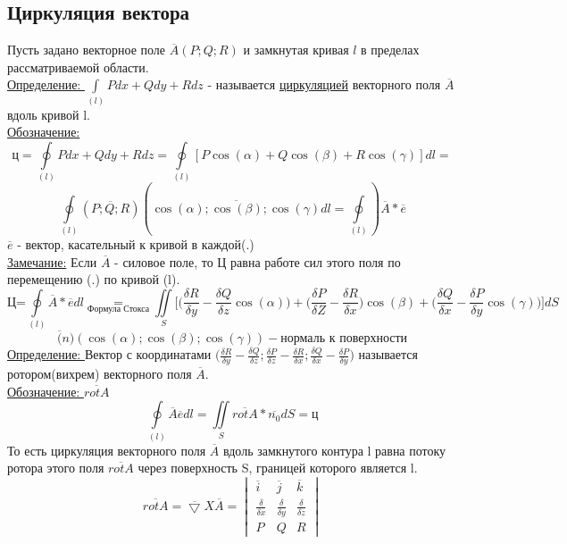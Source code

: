 \documentclass[12pt]{article}
\let\oldint\int
\let\oldiint\iint
\let\oldoint\oint
\renewcommand{\int}{\oldint\limits}
\renewcommand{\oint}{\oldoint\limits}
\renewcommand{\iint}{\oldiint\limits}
\begin{document}
  \subsection{Циркуляция вектора}
  Пусть задано векторное поле $\overline{A}(P;Q;R)$ и замкнутая кривая $l$ в пределах рассматриваемой
  области.\\
  \underline{Определение: }$\int_{(l)} Pdx+Qdy+Rdz$ - называется \underline{циркуляцией} векторного поля
  $\overline{A}$ вдоль кривой l.\\
  \underline{Обозначение:} 
  \[\text{ц} = \oint_{(l)} Pdx+Qdy+Rdz= \oint_{(l)}[P\cos(\alpha)+Q\cos(\beta)+R\cos(\gamma)]dl=\]
  \[\oint_{(l)}(\overline{P;Q;R})(\overline{\cos(\alpha);\cos(\beta);\cos(\gamma)}dl=
  \oint_{(l)})\overline{A}*\overline{e}\]
  $\overline{e}$ - вектор, касательный к кривой в каждой(.)\\
  \underline{Замечание:} Если $\overline{A}$ - силовое поле, то Ц равна работе сил этого поля по
  перемещению (.) по кривой (l).
  \[\text{Ц=} \oint_{(l)} \overline{A}*\overline{e}dl \underset{\text{Формула Стокса}}{=}
  \iint_S \Big[\Big(\frac{\delta R}{\delta y}-\frac{\delta Q}{\delta z}\cos(\alpha)\Big)
  + \Big(\frac{\delta P}{\delta Z} - \frac{\delta R}{\delta x}\Big)\cos(\beta)
  + \Big(\frac{\delta Q}{\delta x}-\frac{\delta P}{\delta y}\cos(\gamma)\Big)\Big]dS\]
  \[\overline(n)(\cos(\alpha);\cos(\beta);\cos(\gamma)) - \text{нормаль к поверхности}\]
  \underline{Определение: } Вектор с координатами $\Big(\frac{\delta R}{\delta y}-\frac{\delta Q}{\delta z};
  \frac{\delta P}{\delta z}-\frac{\delta R}{\delta x};\frac{\delta Q}{\delta x} - \frac{\delta P}{\delta y}\Big)$
  называется ротором(вихрем) векторного поля $\overline{A}$.\\
  \underline{Обозначение: } $\overline{rotA}$
  \[\oint_{(l)}\overline{A}\overline{e}dl = \iint_S \overline{rotA}*\overline{n_0}dS = \text{ц}\]
  То есть циркуляция векторного поля $\overline{A}$ вдоль замкнутого контура l равна потоку ротора этого поля
  $\overline{rotA}$ через поверхность S, границей которого является l.
  \[\overline{rotA} = \overline{\bigtriangledown} X \overline{A} = 
  \begin{vmatrix}
    \overline{i} & \overline{j} &\overline{k}\\
    \frac{\delta}{\delta x} & \frac{\delta }{\delta y} & \frac{\delta }{\delta z}\\
    P & Q & R
  \end{vmatrix}\]
\end{document}
